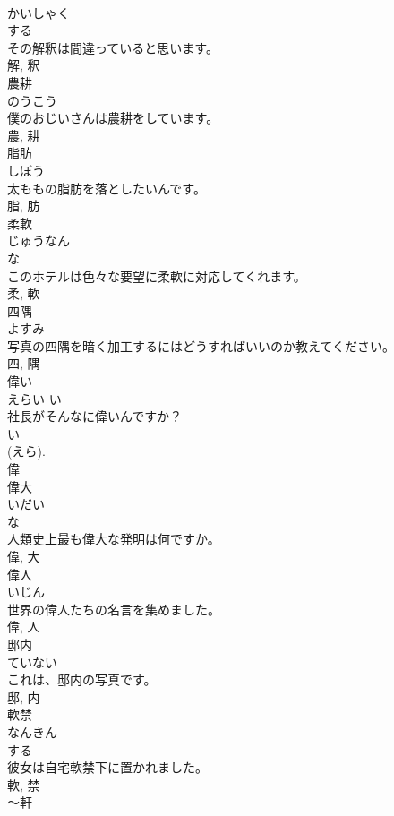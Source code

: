 \documentclass[8pt]{extreport}
\begin{document}
\begin{CJK}{UTF8}{min}
\\	かいしゃく	
\\	する 
\\	その解釈は間違っていると思います。	
\\	解, 釈	
\\	農耕	
\\	のうこう	
\\	僕のおじいさんは農耕をしています。	
\\	農, 耕	
\\	脂肪	
\\	しぼう	
\\	太ももの脂肪を落としたいんです。	
\\	脂, 肪	
\\	柔軟	
\\	じゅうなん	
\\	な 
\\	このホテルは色々な要望に柔軟に対応してくれます。	
\\	柔, 軟	
\\	四隅	
\\	よすみ	
\\	写真の四隅を暗く加工するにはどうすればいいのか教えてください。	
\\	四, 隅	
\\	偉い	
\\	えらい	い 
\\	社長がそんなに偉いんですか？	
\\	い 
\\	(えら). 
\\	偉	
\\	偉大	
\\	いだい	
\\	な 
\\	人類史上最も偉大な発明は何ですか。	
\\	偉, 大	
\\	偉人	
\\	いじん	
\\	世界の偉人たちの名言を集めました。	
\\	偉, 人	
\\	邸内	
\\	ていない	
\\	これは、邸内の写真です。	
\\	邸, 内	
\\	軟禁	
\\	なんきん	
\\	する 
\\	彼女は自宅軟禁下に置かれました。	
\\	軟, 禁	
\\	〜軒	

\end{CJK}
\end{document}

